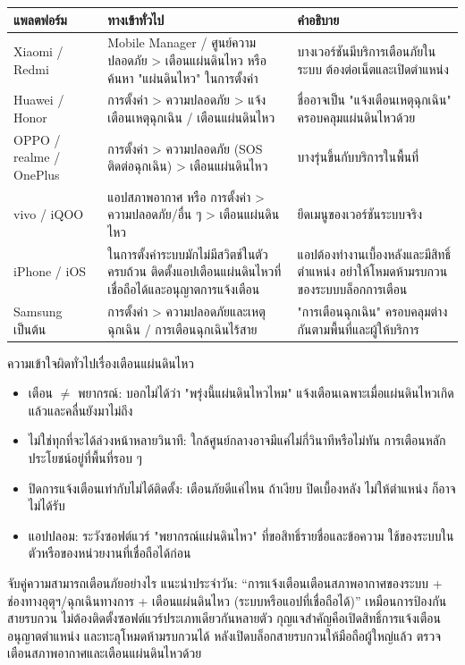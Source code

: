 \begin{center}
\begin{tabularx}{\linewidth}{|X|X|X|}
\hline
\textbf{แพลตฟอร์ม} & \textbf{ทางเข้าทั่วไป} & \textbf{คำอธิบาย} \tabularnewline
\hline
Xiaomi / Redmi & Mobile Manager / ศูนย์ความปลอดภัย > เตือนแผ่นดินไหว หรือ ค้นหา "แผ่นดินไหว" ในการตั้งค่า & บางเวอร์ชันมีบริการเตือนภัยในระบบ ต้องต่อเน็ตและเปิดตำแหน่ง \tabularnewline
Huawei / Honor & การตั้งค่า > ความปลอดภัย > แจ้งเตือนเหตุฉุกเฉิน / เตือนแผ่นดินไหว & ชื่ออาจเป็น "แจ้งเตือนเหตุฉุกเฉิน" ครอบคลุมแผ่นดินไหวด้วย \tabularnewline
OPPO / realme / OnePlus & การตั้งค่า > ความปลอดภัย (SOS ติดต่อฉุกเฉิน) > เตือนแผ่นดินไหว & บางรุ่นขึ้นกับบริการในพื้นที่ \tabularnewline
vivo / iQOO & แอปสภาพอากาศ หรือ การตั้งค่า > ความปลอดภัย/อื่น ๆ > เตือนแผ่นดินไหว & ยึดเมนูของเวอร์ชันระบบจริง \tabularnewline
iPhone / iOS & ในการตั้งค่าระบบมักไม่มีสวิตช์ในตัวครบถ้วน ติดตั้งแอปเตือนแผ่นดินไหวที่เชื่อถือได้และอนุญาตการแจ้งเตือน & แอปต้องทำงานเบื้องหลังและมีสิทธิ์ตำแหน่ง อย่าให้โหมดห้ามรบกวนของระบบบล็อกการเตือน \tabularnewline
Samsung เป็นต้น & การตั้งค่า > ความปลอดภัยและเหตุฉุกเฉิน / การเตือนฉุกเฉินไร้สาย & "การเตือนฉุกเฉิน" ครอบคลุมต่างกันตามพื้นที่และผู้ให้บริการ \tabularnewline
\hline
\end{tabularx}
\end{center}

\begin{tcbwarn}{ความเข้าใจผิดทั่วไปเรื่องเตือนแผ่นดินไหว}
\begin{itemize}
  \item เตือน $\neq$ พยากรณ์: บอกไม่ได้ว่า "พรุ่งนี้แผ่นดินไหวไหม" แจ้งเตือนเฉพาะเมื่อแผ่นดินไหวเกิดแล้วและคลื่นยังมาไม่ถึง
  \item ไม่ใช่ทุกที่จะได้ล่วงหน้าหลายวินาที: ใกล้ศูนย์กลางอาจมีแค่ไม่กี่วินาทีหรือไม่ทัน การเตือนหลักประโยชน์อยู่ที่พื้นที่รอบ ๆ
  \item ปิดการแจ้งเตือนเท่ากับไม่ได้ติดตั้ง: เตือนภัยดีแค่ไหน ถ้าเงียบ ปิดเบื้องหลัง ไม่ให้ตำแหน่ง ก็อาจไม่ได้รับ
  \item แอปปลอม: ระวังซอฟต์แวร์ "พยากรณ์แผ่นดินไหว" ที่ขอสิทธิ์รายชื่อและข้อความ ใช้ของระบบในตัวหรือของหน่วยงานที่เชื่อถือได้ก่อน
\end{itemize}

\end{tcbwarn}

\begin{tcbinfo}{จับคู่ความสามารถเตือนภัยอย่างไร}
แนะนำประจำวัน: “การแจ้งเตือนเตือนสภาพอากาศของระบบ + ช่องทางอุตุฯ/ฉุกเฉินทางการ + เตือนแผ่นดินไหว (ระบบหรือแอปที่เชื่อถือได้)” เหมือนการป้องกันสายรบกวน ไม่ต้องติดตั้งซอฟต์แวร์ประเภทเดียวกันหลายตัว กุญแจสำคัญคือเปิดสิทธิ์การแจ้งเตือน อนุญาตตำแหน่ง และทะลุโหมดห้ามรบกวนได้ หลังเปิดบล็อกสายรบกวนให้มือถือผู้ใหญ่แล้ว ตรวจเตือนสภาพอากาศและเตือนแผ่นดินไหวด้วย

\end{tcbinfo}

